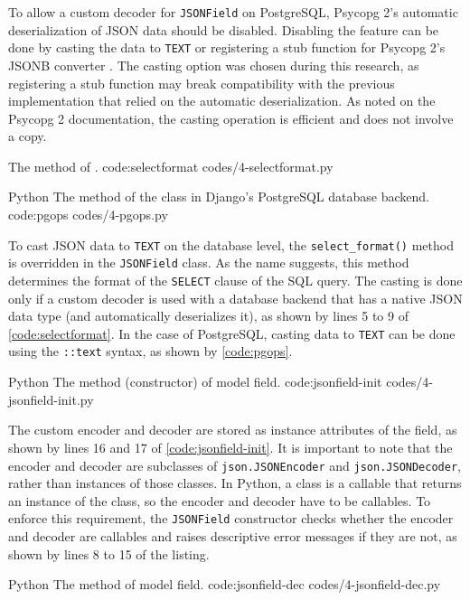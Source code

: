 To allow a custom decoder for \verb|JSONField| on PostgreSQL, Psycopg 2's
automatic deserialization of JSON data should be disabled. Disabling the
feature can be done by casting the data to \verb|TEXT| or registering a stub
function for Psycopg 2's JSONB converter \cite{psycopg2:json-adaptation}.
The casting option was chosen during this research, as registering a stub
function may break compatibility with the previous implementation that
relied on the automatic deserialization. As noted on the Psycopg 2
documentation, the casting operation is efficient and does not involve a copy.

{The  method of .}
{code:selectformat}
{codes/4-selectformat.py}

\listing
{Python}
{The  method of the 
class in Django's PostgreSQL database backend.}
{code:pgops}
{codes/4-pgops.py}

To cast JSON data to \verb|TEXT| on the database level, the
\verb|select_format()| method is overridden in the \verb|JSONField| class. As
the name suggests, this method determines the format of the \verb|SELECT|
clause of the SQL query. The casting is done only if a custom decoder is used
with a database backend that has a native JSON data type (and automatically
deserializes it), as shown by lines 5 to 9 of \autoref{code:selectformat}.
In the case of PostgreSQL, casting data to \verb|TEXT| can be done using the
\verb|::text| syntax, as shown by \autoref{code:pgops}.

\listing
{Python}
{The  method (constructor) of 
model field.}
{code:jsonfield-init}
{codes/4-jsonfield-init.py}

The custom encoder and decoder are stored as instance attributes of the field,
as shown by lines 16 and 17 of \autoref{code:jsonfield-init}. It is important
to note that the encoder and decoder are subclasses of \verb|json.JSONEncoder|
and \verb|json.JSONDecoder|, rather than instances of those classes. In Python,
a class is a callable that returns an instance of the class, so the encoder and
decoder have to be callables. To enforce this requirement, the \verb|JSONField|
constructor checks whether the encoder and decoder are callables and raises
descriptive error messages if they are not, as shown by lines 8 to 15 of the
listing.

\listing
{Python}
{The  method of  model field.}
{code:jsonfield-dec}
{codes/4-jsonfield-dec.py}


